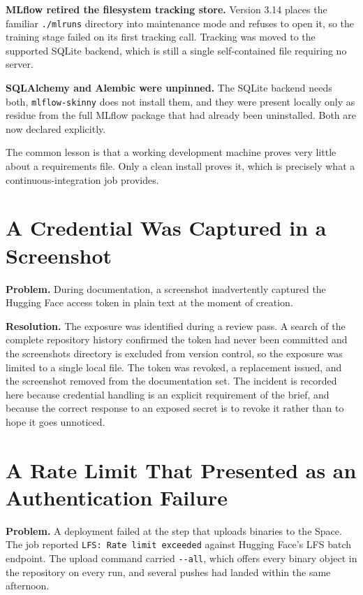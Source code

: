 \documentclass[11pt,a4paper]{report}
\begin{document}
\textbf{MLflow retired the filesystem tracking store.} Version 3.14 places the
familiar \texttt{./mlruns} directory into maintenance mode and refuses to open
it, so the training stage failed on its first tracking call. Tracking was moved
to the supported SQLite backend, which is still a single self-contained file
requiring no server.

\textbf{SQLAlchemy and Alembic were unpinned.} The SQLite backend needs both,
\texttt{mlflow-skinny} does not install them, and they were present locally only
as residue from the full MLflow package that had already been uninstalled. Both
are now declared explicitly.

The common lesson is that a working development machine proves very little about
a requirements file. Only a clean install proves it, which is precisely what a
continuous-integration job provides.

\section{A Credential Was Captured in a Screenshot}

\textbf{Problem.} During documentation, a screenshot inadvertently captured the
Hugging Face access token in plain text at the moment of creation.

\textbf{Resolution.} The exposure was identified during a review pass. A search
of the complete repository history confirmed the token had never been committed
and the screenshots directory is excluded from version control, so the exposure
was limited to a single local file. The token was revoked, a replacement issued,
and the screenshot removed from the documentation set. The incident is recorded
here because credential handling is an explicit requirement of the brief, and
because the correct response to an exposed secret is to revoke it rather than to
hope it goes unnoticed.

\section{A Rate Limit That Presented as an Authentication Failure}

\textbf{Problem.} A deployment failed at the step that uploads binaries to the
Space. The job reported \texttt{LFS: Rate limit exceeded} against Hugging Face's
LFS batch endpoint. The upload command carried \texttt{-{}-all}, which offers
every binary object in the repository on every run, and several pushes had
landed within the same afternoon.
\end{document}
